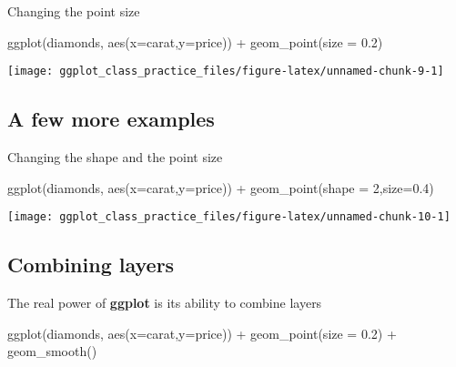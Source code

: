 \documentclass[
]{article}
\newenvironment{Shaded}{\begin{snugshade}}{\end{snugshade}}
\newcommand{\AttributeTok}[1]{\textcolor[rgb]{0.77,0.63,0.00}{#1}}
\newcommand{\DecValTok}[1]{\textcolor[rgb]{0.00,0.00,0.81}{#1}}
\newcommand{\FloatTok}[1]{\textcolor[rgb]{0.00,0.00,0.81}{#1}}
\newcommand{\FunctionTok}[1]{\textcolor[rgb]{0.00,0.00,0.00}{#1}}
\newcommand{\NormalTok}[1]{#1}
\newcommand{\SpecialCharTok}[1]{\textcolor[rgb]{0.00,0.00,0.00}{#1}}
\begin{document}
Changing the point size

\begin{Shaded}
\begin{Highlighting}[]
\FunctionTok{ggplot}\NormalTok{(diamonds, }\FunctionTok{aes}\NormalTok{(}\AttributeTok{x=}\NormalTok{carat,}\AttributeTok{y=}\NormalTok{price)) }\SpecialCharTok{+} \FunctionTok{geom\_point}\NormalTok{(}\AttributeTok{size =} \FloatTok{0.2}\NormalTok{)}
\end{Highlighting}
\end{Shaded}

\begin{center}\texttt{[image: ggplot\_class\_practice\_files/figure-latex/unnamed-chunk-9-1]} \end{center}

\hypertarget{a-few-more-examples-2}{%
\subsection{A few more examples}\label{a-few-more-examples-2}}

Changing the shape and the point size

\begin{Shaded}
\begin{Highlighting}[]
\FunctionTok{ggplot}\NormalTok{(diamonds, }\FunctionTok{aes}\NormalTok{(}\AttributeTok{x=}\NormalTok{carat,}\AttributeTok{y=}\NormalTok{price)) }\SpecialCharTok{+} \FunctionTok{geom\_point}\NormalTok{(}\AttributeTok{shape =} \DecValTok{2}\NormalTok{,}\AttributeTok{size=}\FloatTok{0.4}\NormalTok{)}
\end{Highlighting}
\end{Shaded}

\begin{center}\texttt{[image: ggplot\_class\_practice\_files/figure-latex/unnamed-chunk-10-1]} \end{center}

\hypertarget{combining-layers}{%
\subsection{Combining layers}\label{combining-layers}}

The real power of \textbf{ggplot} is its ability to combine layers

\begin{Shaded}
\begin{Highlighting}[]
\FunctionTok{ggplot}\NormalTok{(diamonds, }\FunctionTok{aes}\NormalTok{(}\AttributeTok{x=}\NormalTok{carat,}\AttributeTok{y=}\NormalTok{price)) }\SpecialCharTok{+} \FunctionTok{geom\_point}\NormalTok{(}\AttributeTok{size =} \FloatTok{0.2}\NormalTok{) }\SpecialCharTok{+}
  \FunctionTok{geom\_smooth}\NormalTok{()}
\end{Highlighting}
\end{Shaded}
\end{document}

